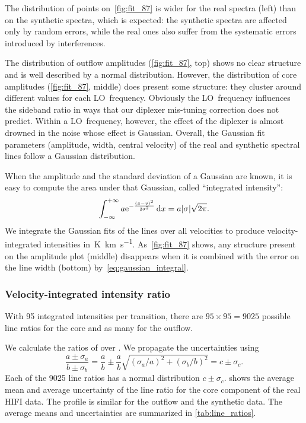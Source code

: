 The distribution of points on~\cref{fig:fit_87} is wider for the real spectra (left) than on the synthetic spectra, which is expected:
the synthetic spectra are affected only by random errors, while the real ones also suffer from the systematic errors introduced by interferences.

The distribution of outflow amplitudes (\cref{fig:fit_87}, top) shows no clear structure and is well described by a normal distribution.
However, the distribution of core amplitudes (\cref{fig:fit_87}, middle) does present some structure:
they cluster around different values for each LO~frequency.
Obviously the LO~frequency influences the sideband ratio in ways that our diplexer mis-tuning correction does not predict.
Within a LO~frequency, however, the effect of the diplexer is almost drowned in the noise
whose effect is Gaussian.
Overall, the Gaussian fit parameters (amplitude, width, central velocity) of the real and synthetic spectral lines follow a Gaussian distribution.

When the amplitude and the standard deviation of a Gaussian are known, it is easy to compute the area under that Gaussian, called ``integrated intensity'':
\begin{equation}
    \int_{-\infty}^{+\infty} a \mathrm{e}^{- \frac{(x-v)^2}{2 \sigma^2}}\,\mathrm{d}x
    =
    a \abs{\sigma} \sqrt{2\pi}
    \text{.}
    \label{eq:gaussian_integral}
\end{equation}
We integrate the Gaussian fits of the lines over all velocities to produce velocity-integrated intensities in~\si{\kelvin \kilo\meter\per\second}.
As~\cref{fig:fit_87} shows, any structure present on the amplitude plot (middle) disappears when it is combined with the error on the line width (bottom) by~\cref{eq:gaussian_integral}.





\FloatBarrier
\subsubsection{Velocity-integrated intensity ratio}
\label{sec:line_ratios}
With 95 integrated intensities per transition, there are $95 \times 95 = 9025$ possible line ratios for the core and as many for the outflow.

We calculate the ratios of  over .
We propagate the uncertainties using
\begin{equation}
    \frac{a \pm \sigma_a}{b \pm \sigma_b}
    =
    \frac{a}{b} \pm \frac{a}{b}\sqrt{(\sigma_a / a)^2 + (\sigma_b / b)^2}
    = c \pm \sigma_c
    \text{.}
\end{equation}
Each of the 9025 line ratios has a normal distribution $c \pm \sigma_c$.
 shows the average mean and average uncertainty of the line ratio for the core component of the real HIFI data.
The profile is similar for the outflow and the synthetic data.
The average means and uncertainties are summarized in \cref{tab:line_ratios}.

